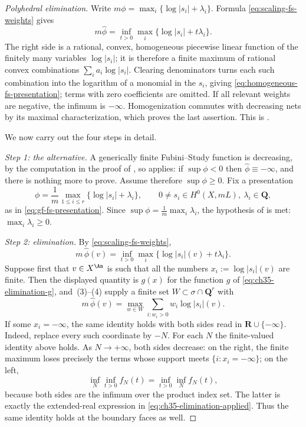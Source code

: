 \begin{proof}[Polyhedral elimination]
Write $m\phi=\max_i\{\log|s_i|+\lambda_i\}$.  Formula
\eqref{eq:scaling-fs-weights} gives
\[
 m\widehat\phi
  =\inf_{t>0}\max_i\{\log|s_i|+t\lambda_i\}.
\]
The right side is a rational, convex, homogeneous piecewise linear function
of the finitely many variables $\log|s_i|$; it is therefore a finite
maximum of rational convex combinations
$\sum_i a_i\log|s_i|$.  Clearing denominators turns each such combination
into the logarithm of a monomial in the $s_i$, giving
\eqref{eq:homogeneous-fs-presentation}; terms with zero coefficients
are omitted. If all relevant weights are
negative, the infimum is $-\infty$.  Homogenization commutes with
decreasing nets by its maximal characterization, which proves the last
assertion.  This is \cite[Theorem~6.15 and Corollary~6.17]{BJ22}.

We now carry out the four steps in detail.

\emph{Step 1: the alternative.}  A generically finite Fubini--Study
function is decreasing, by the computation in the proof of
, so
 applies: if
$\sup\phi<0$ then $\widehat\phi\equiv-\infty$, and there is nothing more
to prove.  Assume therefore $\sup\phi\geq0$.  Fix a presentation
\begin{equation}
\label{eq:ch35-gf-presentation-fixed}
 \phi=\frac1m\max_{1\leq i\leq r}\{\log|s_i|+\lambda_i\},
 \qquad 0\neq s_i\in H^0(X,mL),\ \lambda_i\in\mathbf Q,
\end{equation}
as in \eqref{eq:gf-fs-presentation}.  Since
$\sup\phi=\frac1m\max_i\lambda_i$, the hypothesis of
 is met: $\max_i\lambda_i\geq0$.

\emph{Step 2: elimination.}  By \eqref{eq:scaling-fs-weights},
\[
 m\,\widehat\phi(v)=\inf_{t>0}\max_i\{\log|s_i|(v)+t\lambda_i\}.
\]
Suppose first that $v\in X^{\An}$ is such that all the numbers
$x_i:=\log|s_i|(v)$ are finite.  Then the displayed quantity is
$g(x)$ for the function $g$ of \eqref{eq:ch35-elimination-g}, and
\,(3)--(4) supply a finite set
$W\subset\sigma\cap\mathbf Q^r$ with
\begin{equation}
\label{eq:ch35-elimination-applied}
 m\,\widehat\phi(v)=\max_{w\in W}\sum_{i:w_i>0}w_i\log|s_i|(v).
\end{equation}
If some $x_i=-\infty$, the same identity holds with both sides read in
$\mathbf R\cup\{-\infty\}$.  Indeed, replace every such coordinate by
$-N$.  For each $N$ the finite-valued identity above holds.  As
$N\to+\infty$, both sides decrease: on the right, the finite maximum
loses precisely the terms whose support meets
$\{i:x_i=-\infty\}$; on the left,
\[
 \inf_N\inf_{t>0}f_N(t)=\inf_{t>0}\inf_N f_N(t),
\]
because both sides are the infimum over the product index set.  The latter
is exactly the extended-real expression in
\eqref{eq:ch35-elimination-applied}.  Thus the same identity holds at the
boundary faces as well.


\end{proof}
